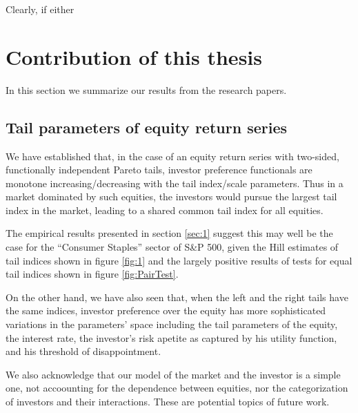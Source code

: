 Clearly, if either 

\section{Contribution of this thesis}\label{sec:contr}

In this section we summarize our results from the research papers.

\subsection{Tail parameters of equity return series}
We have established that, in the case of an equity return series with
two-sided, functionally independent Pareto tails, investor
preference functionals are monotone increasing/decreasing with the
tail index/scale parameters. Thus in a market dominated by such
equities, the investors would pursue the largest tail index in the
market, leading to a shared common tail index for all equities.

The empirical results presented in section \ref{sec:1} suggest this
may well be the case for the ``Consumer Staples'' sector of S\&P 500,
given the Hill estimates of tail indices shown in figure \ref{fig:1}
and the largely positive results of tests for equal tail indices shown
in figure \ref{fig:PairTest}.

On the other hand, we have also seen that, when the left and the right
tails have the same indices, investor preference over the equity has
more sophisticated variations in the parameters' space including the
tail parameters of the equity, the interest rate, the investor's risk
apetite as captured by his utility function, and his threshold of
disappointment.

We also acknowledge that our model of the market and the investor is a
simple one, not accoounting for the dependence between equities, nor
the categorization of investors and their interactions. These are
potential topics of future work.

